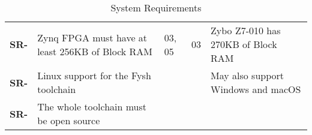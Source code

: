 \resetfyshcounter
\newcommand{\sr}[4]{
	\textbf{SR-\rc} & #1 & #2 & #3 & #4 \\
	\hline
}
\begin{table}[H]
	\begin{tabularx}{\textwidth}{| a | x | a | a | a |}
		\hline

		 &  %
		           &                           %
		           &                           %
		           &                           \\
		\hline
		\sr{Zynq FPGA must have at least 256KB of Block RAM}%
		{03, 05}%
		{03}%
		{Zybo Z7-010 has 270KB of Block RAM} %

		\sr{Linux support for the Fysh toolchain}%
		{}%
		{}%
		{May also support Windows and macOS}

		\sr{The whole toolchain must be open source}%
		{}%
		{}%
		{}
	\end{tabularx}
	\caption{System Requirements}
\end{table}


